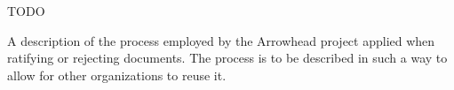 %
%

TODO

A description of the process employed by the Arrowhead project applied when ratifying or rejecting documents.
The process is to be described in such a way to allow for other organizations to reuse it.